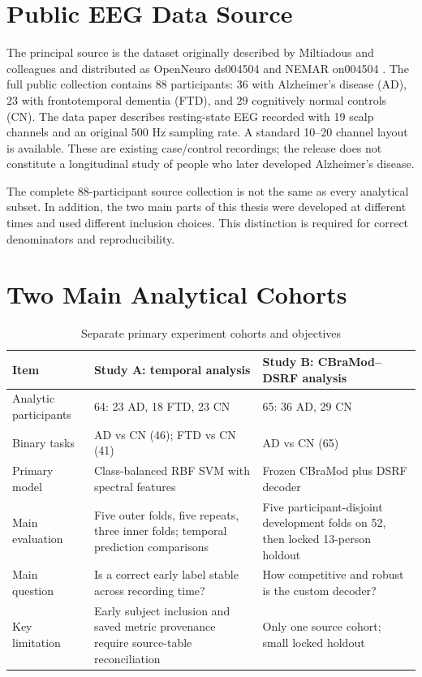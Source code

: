 \section{Public EEG Data Source}
The principal source is the dataset originally described by Miltiadous and colleagues and distributed as OpenNeuro ds004504 and NEMAR on004504 \cite{miltiadous2023dataset,miltiadous2026dataset}. The full public collection contains 88 participants: 36 with Alzheimer's disease (AD), 23 with frontotemporal dementia (FTD), and 29 cognitively normal controls (CN). The data paper describes resting-state EEG recorded with 19 scalp channels and an original 500 Hz sampling rate. A standard 10--20 channel layout is available. These are existing case/control recordings; the release does not constitute a longitudinal study of people who later developed Alzheimer's disease.

The complete 88-participant source collection is not the same as every analytical subset. In addition, the two main parts of this thesis were developed at different times and used different inclusion choices. This distinction is required for correct denominators and reproducibility.

\section{Two Main Analytical Cohorts}
\begin{table}[htbp]\centering\small
\caption{Separate primary experiment cohorts and objectives}\label{tab:cohorts}
\begin{tabularx}{\textwidth}{@{}p{}p{}X@{}}\toprule
\textbf{Item}&\textbf{Study A: temporal analysis}&\textbf{Study B: CBraMod--DSRF analysis}\\\midrule
Analytic participants&64: 23 AD, 18 FTD, 23 CN&65: 36 AD, 29 CN\\
Binary tasks&AD vs CN (46); FTD vs CN (41)&AD vs CN (65)\\
Primary model&Class-balanced RBF SVM with spectral features&Frozen CBraMod plus DSRF decoder\\
Main evaluation&Five outer folds, five repeats, three inner folds; temporal prediction comparisons&Five participant-disjoint development folds on 52, then locked 13-person holdout\\
Main question&Is a correct early label stable across recording time?&How competitive and robust is the custom decoder?\\
Key limitation&Early subject inclusion and saved metric provenance require source-table reconciliation&Only one source cohort; small locked holdout\\
\bottomrule\end{tabularx}\end{table}

